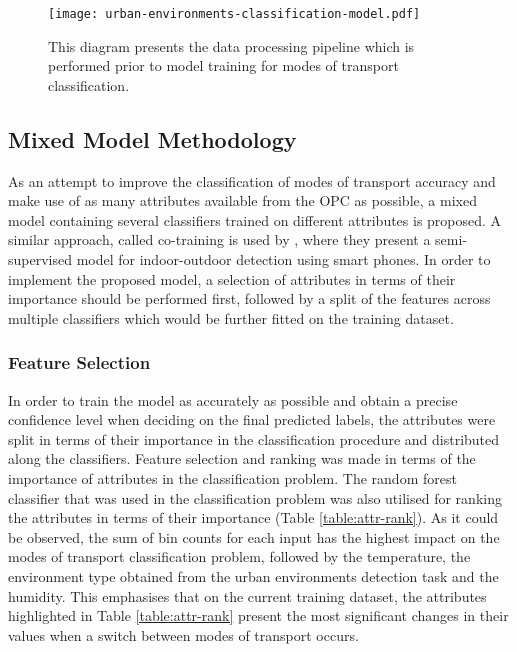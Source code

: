 \documentclass[bsc,frontabs,twoside,singlespacing, parskip,deptreport]{infthesis}     %
\begin{document}
\begin{figure}[h!]
  \center
  \texttt{[image: urban-environments-classification-model.pdf]}
  \caption{This diagram presents the data processing pipeline which is performed prior to model training for modes of transport classification.}
  \label{fig:urban-environments-classification-model}
\end{figure}

\subsection{Mixed Model Methodology}
\label{subsec:mixed-model-methodology}

As an attempt to improve the classification of modes of transport accuracy and make use of as many attributes available from the OPC as possible, a mixed model containing several classifiers trained on different attributes is proposed. A similar approach, called co-training is used by \cite{Radu2014}, where they present a semi-supervised model for indoor-outdoor detection using smart phones. In order to implement the proposed model, a selection of attributes in terms of their importance should be performed first, followed by a split of the features across multiple classifiers which would be further fitted on the training dataset.


\subsubsection{Feature Selection}
\label{subsubsec:feat-selection}

In order to train the model as accurately as possible and obtain a precise confidence level when deciding on the final predicted labels, the attributes were split in terms of their importance in the classification procedure and distributed along the classifiers. Feature selection and ranking was made in terms of the importance of attributes in the classification problem. The random forest classifier that was used in the classification problem was also utilised for ranking the attributes in terms of their importance (Table \ref{table:attr-rank}). As it could be observed, the sum of bin counts for each input has the highest impact on the modes of transport classification problem, followed by the temperature, the environment type obtained from the urban environments detection task and the humidity. This emphasises that on the current training dataset, the attributes highlighted in Table \ref{table:attr-rank} present the most significant changes in their values when a switch between modes of transport occurs.
\end{document}
